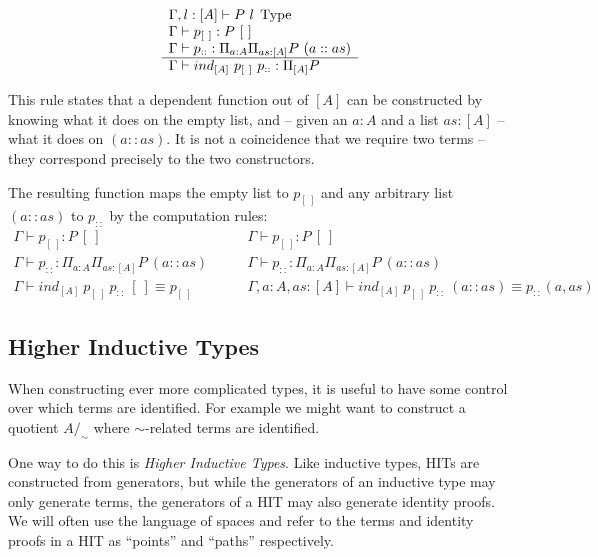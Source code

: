 \[
  \begin{array}{l}
    \Gamma, l : [A] \vdash P~l \; \operatorname{Type}\\
    \Gamma \vdash p_{[~]} : P~[~]\\
    \Gamma \vdash p_{::}: \Pi_{a:A} \Pi_{as:[A]} P~(a :: as)\\
    \hline
    \Gamma \vdash ind_{[A]}~p_{[~]}~p_{::} : \Pi_{[A]} P
  \end{array}
\]

This rule states that a dependent function out of $[A]$ can be constructed by
knowing what it does on the empty list, and -- given an $a:A$ and a list $as:[A]$ -- what
it does on $(a :: as)$. It is not a coincidence that we require two terms --
they correspond precisely to the two constructors.

The resulting function maps the empty list to $p_{[~]}$ and any arbitrary list
$(a::as)$ to $p_{::}$ by the computation rules:
\begin{equation*}
  \begin{array}{c}
    \Gamma \vdash p_{[~]} : P~[~]\\
    \Gamma \vdash p_{::}: \Pi_{a:A} \Pi_{as:[A]} P~(a :: as)\\
    \hline
    \Gamma \vdash ind_{[A]}~p_{[~]}~p_{::}~[~] \equiv p_{[~]}
  \end{array}
\qquad
  \begin{array}{c}
    \Gamma \vdash p_{[~]} : P~[~]\\
    \Gamma \vdash p_{::}: \Pi_{a:A} \Pi_{as:[A]} P~(a :: as)\\
    \hline
    \Gamma, a:A, as:[A] \vdash ind_{[A]}~p_{[~]}~p_{::}~(a::as) \equiv p_{::}(a,as)
  \end{array}
\end{equation*}

\subsection{Higher Inductive Types}

When constructing ever more complicated types, it is useful to have some
control over which terms are identified. For example we might want to construct
a quotient $A/_\sim$ where $\sim$-related terms are identified.

One way to do this is \emph{Higher Inductive Types}. Like inductive types, HITs
are constructed from generators, but while the generators of an inductive type
may only generate terms, the generators of a HIT may also generate identity
proofs. We will often use the language of spaces and refer to the terms
and identity proofs in a HIT as ``points'' and ``paths'' respectively.

